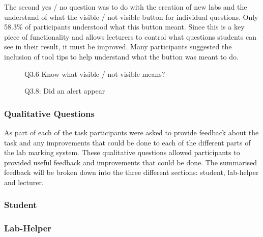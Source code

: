 \documentclass[12pt]{article}  %
\begin{document}
The second yes / no question was to do with the creation of new labs and the understand of what the visible / not visible button for individual questions. Only 58.3\% of participants understood what this button meant. Since this is a key piece of functionality and allows lecturers to control what questions students can see in their result, it must be improved. Many participants suggested the inclusion of tool tips to help understand what the button was meant to do. 

\begin{figure}[H]
\caption{Q3.6 Know what visible / not visible means?}


\end{figure}


\begin{figure}[H]
\caption{Q3.8: Did an alert appear}


\end{figure}


\subsubsection{Qualitative Questions}

As part of each of the task participants were asked to provide feedback about the task and any improvements that could be done to each of the different parts of the lab marking system. These qualitative questions allowed participants to provided useful feedback and improvements that could be done. The summarised feedback will be broken down into the three different sections: student, lab-helper and lecturer.

\subsubsection*{Student}

\subsubsection*{Lab-Helper}
\end{document}
